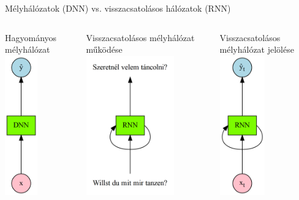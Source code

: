 \documentclass[english, aspectratio=169]{beamer}
\begin{document}
\begin{frame}{Mélyhálózatok (DNN) vs. visszacsatolásos hálózatok (RNN)}
\begin{columns}
\begin{column}{.3\textwidth}
\begin{center}
Hagyományos mélyhálózat
\includegraphics[height=6cm, keepaspectratio]{graphs/recurrent_1.png}
\end{center}
\end{column}
\begin{column}{.3\textwidth}
\begin{center}
Visszacsatolásos mélyhálózat működése
\includegraphics[height=6cm, keepaspectratio]{graphs/recurrent_2.png}
\end{center}
\end{column}
\begin{column}{.3\textwidth}
\begin{center}
Visszacsatolásos mélyhálózat jelölése
\includegraphics[height=6cm, keepaspectratio]{graphs/recurrent_3.png}
\end{center}
\end{column}
\end{columns}
\end{frame}
\end{document}
